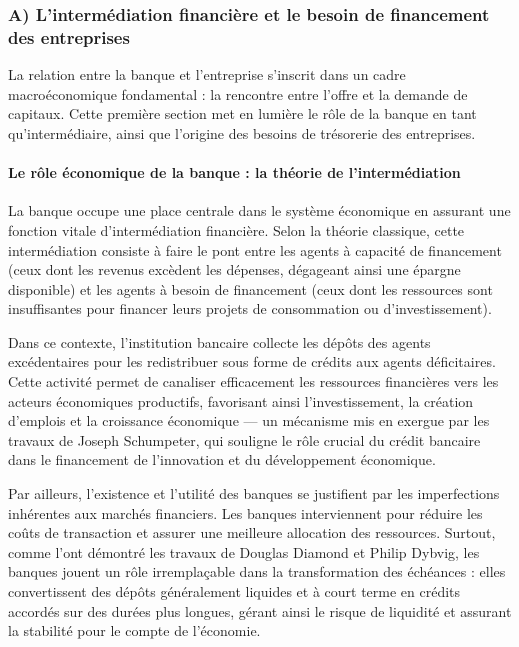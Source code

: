 \subsubsection*{A) L'intermédiation financière et le besoin de financement des entreprises}

La relation entre la banque et l'entreprise s'inscrit dans un cadre macroéconomique fondamental : la rencontre entre l'offre et la demande de capitaux. Cette première section met en lumière le rôle de la banque en tant qu'intermédiaire, ainsi que l'origine des besoins de trésorerie des entreprises.

\paragraph{Le rôle économique de la banque : la théorie de l'intermédiation}

La banque occupe une place centrale dans le système économique en assurant une fonction vitale d'intermédiation financière. Selon la théorie classique, cette intermédiation consiste à faire le pont entre les agents à capacité de financement (ceux dont les revenus excèdent les dépenses, dégageant ainsi une épargne disponible) et les agents à besoin de financement (ceux dont les ressources sont insuffisantes pour financer leurs projets de consommation ou d'investissement).

Dans ce contexte, l'institution bancaire collecte les dépôts des agents excédentaires pour les redistribuer sous forme de crédits aux agents déficitaires. Cette activité permet de canaliser efficacement les ressources financières vers les acteurs économiques productifs, favorisant ainsi l'investissement, la création d'emplois et la croissance économique --- un mécanisme mis en exergue par les travaux de Joseph Schumpeter, qui souligne le rôle crucial du crédit bancaire dans le financement de l'innovation et du développement économique.

Par ailleurs, l'existence et l'utilité des banques se justifient par les imperfections inhérentes aux marchés financiers. Les banques interviennent pour réduire les coûts de transaction et assurer une meilleure allocation des ressources. Surtout, comme l'ont démontré les travaux de Douglas Diamond et Philip Dybvig, les banques jouent un rôle irremplaçable dans la transformation des échéances : elles convertissent des dépôts généralement liquides et à court terme en crédits accordés sur des durées plus longues, gérant ainsi le risque de liquidité et assurant la stabilité pour le compte de l'économie.

